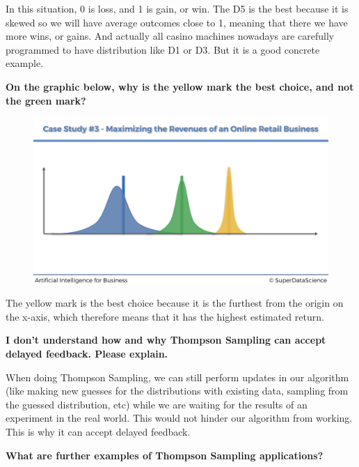 \documentclass[]{book}
\begin{document}
In this situation, 0 is loss, and 1 is gain, or win. The D5 is the best because it is skewed so we will have average outcomes close to 1, meaning that there we have more wins, or gains. And actually all casino machines nowadays are carefully programmed to have distribution like D1 or D3. But it is a good concrete example.

\textbf{On the graphic below, why is the yellow mark the best choice, and not the green mark?}

\begin{figure}[!htbp]
        \begin{center}
            \includegraphics[scale=0.18]{Beta_Distribution_Slide.png}
        \end{center}
\end{figure}

The yellow mark is the best choice because it is the furthest from the origin on the x-axis, which therefore means that it has the highest estimated return.

\newpage

\textbf{I don't understand how and why Thompson Sampling can accept delayed feedback. Please explain.}

When doing Thompson Sampling, we can still perform updates in our algorithm (like making new guesses for the distributions with existing data, sampling from the guessed distribution, etc) while we are waiting for the results of an experiment in the real world. This would not hinder our algorithm from working. This is why it can accept delayed feedback.

\textbf{What are further examples of Thompson Sampling applications?}
\end{document}
